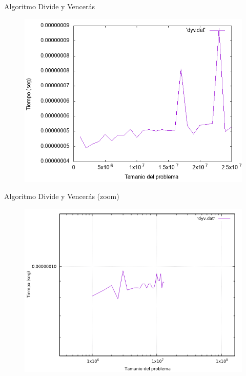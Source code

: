 \documentclass{beamer}
\begin{document}
\begin{frame}[fragile]{Algoritmo Divide y Vencerás}
\begin{figure}[H]
\centering
\includegraphics[scale=0.5]{dyv.png}
\end{figure}
\end{frame}

\begin{frame}[fragile]{Algoritmo Divide y Vencerás (zoom)}
\begin{figure}[H]
\centering
\includegraphics[scale=0.5]{dyv_zoom.png}
\end{figure}
\end{frame}
\end{document}
